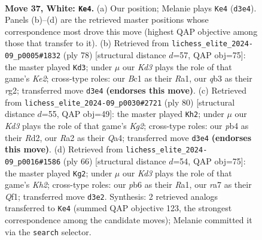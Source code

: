 \documentclass[11pt]{article}
\begin{document}
\clearpage

\begin{figure}[p]\centering
\begin{subfigure}{0.46\textwidth}\centering
\resizebox{\linewidth}{!}{%
\newchessgame
\chessboard[
  setfen={7r/r3k3/1pp1p1pp/6P1/Pp1P4/1q1KP3/R4Q2/2B5 w - - 0 37},
  showmover=false,
  pgfstyle=straightmove, color=movearrow, markmove={d3-e4}
]}
\caption{}
\end{subfigure}\hfill
\begin{subfigure}{0.46\textwidth}\centering
\resizebox{\linewidth}{!}{%
\newchessgame
\chessboard[
  setfen={6k1/1pp2pp1/2P5/8/Q3Pq2/P1B2P1p/1P2K1r1/R7 w - - 0 40},
  showmover=false,
  pgfstyle=straightmove, color=movearrow, markmove={e2-d3}
]}
\caption{}
\end{subfigure}
\\[4pt]
\begin{subfigure}{0.46\textwidth}\centering
\resizebox{\linewidth}{!}{%
\newchessgame
\chessboard[
  setfen={1r4k1/5p2/6pp/3qp3/Q2P3P/P5P1/3R1PK1/8 w - - 1 41},
  showmover=false,
  pgfstyle=straightmove, color=movearrow, markmove={g2-h2}
]}
\caption{}
\end{subfigure}\hfill
\begin{subfigure}{0.46\textwidth}\centering
\resizebox{\linewidth}{!}{%
\newchessgame
\chessboard[
  setfen={4r1k1/6p1/2p4p/3p1P2/PP1B1q2/2P4P/5p1K/R4Q2 w - - 1 34},
  showmover=false,
  pgfstyle=straightmove, color=movearrow, markmove={h2-g2}
]}
\caption{}
\end{subfigure}
\caption{\textbf{Move 37, White: \texttt{Ke4}.} (a) Our position; Melanie plays \texttt{Ke4} (\texttt{d3e4}). Panels (b)--(d) are the retrieved master positions whose correspondence most drove this move (highest QAP objective among those that transfer to it). (b) Retrieved from \texttt{lichess\_elite\_2024-09\_p0005\#1832} (ply 78) [structural distance $d$=57, QAP obj=75]: the master played \texttt{Kd3}; under $\mu$ our \emph{Kd3} plays the role of that game's \emph{Ke2}; cross-type roles: our \emph{B}c1 as their \emph{R}a1, our \emph{q}b3 as their \emph{r}g2; transferred move \texttt{d3e4} \textbf{(endorses this move)}. (c) Retrieved from \texttt{lichess\_elite\_2024-09\_p0030\#2721} (ply 80) [structural distance $d$=55, QAP obj=49]: the master played \texttt{Kh2}; under $\mu$ our \emph{Kd3} plays the role of that game's \emph{Kg2}; cross-type roles: our \emph{p}b4 as their \emph{R}d2, our \emph{R}a2 as their \emph{Q}a4; transferred move \texttt{d3e4} \textbf{(endorses this move)}. (d) Retrieved from \texttt{lichess\_elite\_2024-09\_p0016\#1586} (ply 66) [structural distance $d$=54, QAP obj=75]: the master played \texttt{Kg2}; under $\mu$ our \emph{Kd3} plays the role of that game's \emph{Kh2}; cross-type roles: our \emph{p}b6 as their \emph{R}a1, our \emph{r}a7 as their \emph{Q}f1; transferred move \texttt{d3e2}. Synthesis: 2 retrieved analogs transferred to \texttt{Ke4} (summed QAP objective 123, the strongest correspondence among the candidate moves); Melanie committed it via the \texttt{search} selector.}
\label{fig:thought-m72}
\end{figure}
\end{document}
